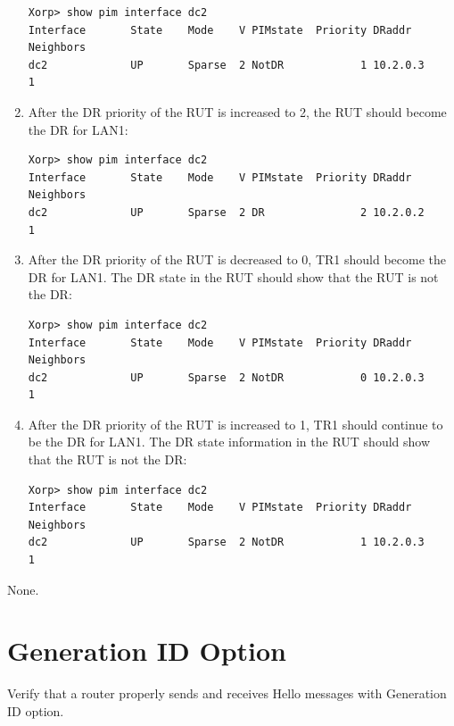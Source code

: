 \documentclass[11pt]{report}
\begin{document}
\begin{enumerate}
\begin{verbatim}
Xorp> show pim interface dc2
Interface       State    Mode    V PIMstate  Priority DRaddr      Neighbors
dc2             UP       Sparse  2 NotDR            1 10.2.0.3            1
\end{verbatim}

  \item After the DR priority of the RUT is increased to 2, the RUT should
        become the DR for LAN1:

\begin{verbatim}
Xorp> show pim interface dc2
Interface       State    Mode    V PIMstate  Priority DRaddr      Neighbors
dc2             UP       Sparse  2 DR               2 10.2.0.2            1
\end{verbatim}

  \item After the DR priority of the RUT is decreased to 0, TR1 should become
        the DR for LAN1. The DR state in the RUT should show that the RUT
        is not the DR:

\begin{verbatim}
Xorp> show pim interface dc2
Interface       State    Mode    V PIMstate  Priority DRaddr      Neighbors
dc2             UP       Sparse  2 NotDR            0 10.2.0.3            1
\end{verbatim}

  \item After the DR priority of the RUT is increased to 1, TR1 should
        continue to be the DR for LAN1. The DR state information in the RUT
        should show that the RUT is not the DR:

\begin{verbatim}
Xorp> show pim interface dc2
Interface       State    Mode    V PIMstate  Priority DRaddr      Neighbors
dc2             UP       Sparse  2 NotDR            1 10.2.0.3            1
\end{verbatim}

\end{enumerate}

None.

\newpage
\section{Generation ID Option}

Verify that a router properly sends and receives Hello messages with
Generation ID option.
\end{document}
